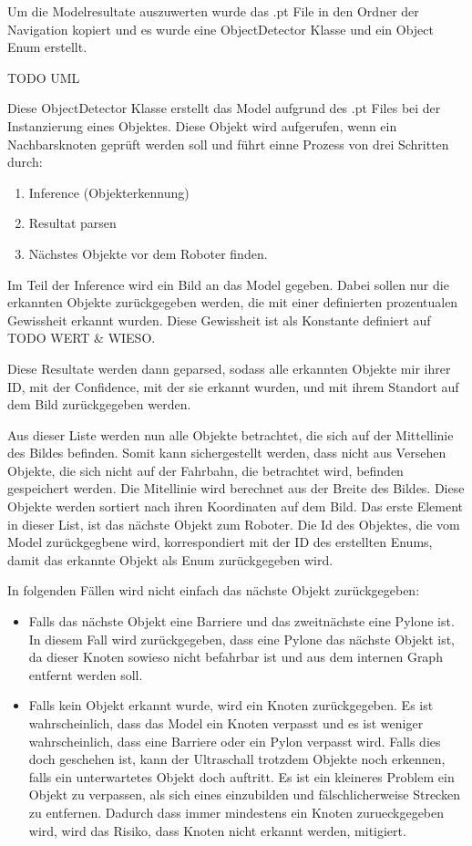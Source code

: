 Um die Modelresultate auszuwerten wurde das .pt File in den Ordner der Navigation kopiert und es wurde eine ObjectDetector Klasse und ein Object Enum erstellt.

TODO UML

Diese ObjectDetector Klasse erstellt das Model aufgrund des .pt Files bei der Instanzierung eines Objektes. Diese Objekt wird aufgerufen, wenn ein Nachbarsknoten geprüft werden soll und führt einne Prozess von drei Schritten durch:

\begin{enumerate}
    \item Inference (Objekterkennung)
    \item Resultat parsen
    \item Nächstes Objekte vor dem Roboter finden.
\end{enumerate}

Im Teil der Inference wird ein Bild an das Model gegeben. Dabei sollen nur die erkannten Objekte zurückgegeben werden, die mit einer definierten prozentualen Gewissheit erkannt wurden. Diese Gewissheit ist als Konstante definiert auf TODO WERT \& WIESO.

Diese Resultate werden dann geparsed, sodass alle erkannten Objekte mir ihrer ID, mit der Confidence, mit der sie erkannt wurden, und mit ihrem Standort auf dem Bild zurückgegeben werden.

Aus dieser Liste werden nun alle Objekte betrachtet, die sich auf der Mittellinie des Bildes befinden. Somit kann sichergestellt werden, dass nicht aus Versehen Objekte, die sich nicht auf der Fahrbahn, die betrachtet wird, befinden gespeichert werden. Die Mitellinie wird berechnet aus der Breite des Bildes. Diese Objekte werden sortiert nach ihren Koordinaten auf dem Bild. Das erste Element in dieser List, ist das nächste Objekt zum Roboter. Die Id des Objektes, die vom Model zurückgegbene wird, korrespondiert mit der ID des erstellten Enums, damit das erkannte Objekt als Enum zurückgegeben wird.

In folgenden Fällen wird nicht einfach das nächste Objekt zurückgegeben:

\begin{itemize}
    \item Falls das nächste Objekt eine Barriere und das zweitnächste eine Pylone ist. In diesem Fall wird zurückgegeben, dass eine Pylone das nächste Objekt ist, da dieser Knoten sowieso nicht befahrbar ist und aus dem internen Graph entfernt werden soll.
    \item Falls kein Objekt erkannt wurde, wird ein Knoten zurückgegeben. Es ist wahrscheinlich, dass das Model ein Knoten verpasst und es ist weniger wahrscheinlich, dass eine Barriere oder ein Pylon verpasst wird. Falls dies doch geschehen ist, kann der Ultraschall trotzdem Objekte noch erkennen, falls ein unterwartetes Objekt doch auftritt. Es ist ein kleineres Problem ein Objekt zu verpassen, als sich eines einzubilden und fälschlicherweise Strecken zu entfernen. Dadurch dass immer mindestens ein Knoten zurueckgegeben wird, wird das Risiko, dass Knoten nicht erkannt werden, mitigiert.
\end{itemize}


